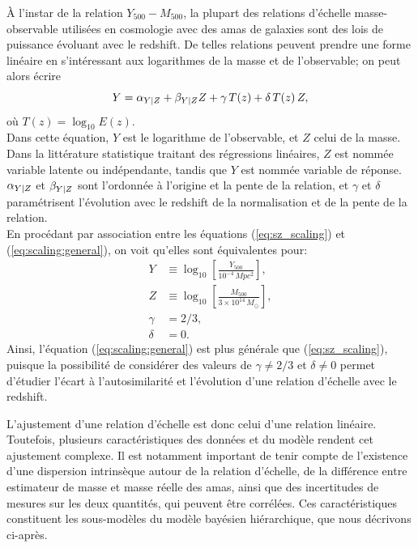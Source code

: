 À l'instar de la relation $Y_{500} - M_{500}$, la plupart des relations d'échelle masse-observable utilisées en cosmologie avec des amas de galaxies sont des lois de puissance évoluant avec le redshift.
De telles relations peuvent prendre une forme linéaire en s'intéressant aux logarithmes de la masse et de l'observable; on peut alors écrire
\begin{equation}
    \label{eq:scaling:general}
    Y = \alpha_{Y|Z} + \beta_{Y|Z} Z + \gamma \, T(z) + \delta \, T(z) \, Z,
\end{equation}
où $T(z) = \log_{10} E(z)$. \\
Dans cette équation, $Y$ est le logarithme de l'observable, et $Z$ celui de la masse\footnotemark.
Dans la littérature statistique traitant des régressions linéaires, $Z$ est nommée variable latente ou indépendante, tandis que $Y$ est nommée variable de réponse.
$\alpha_{Y|Z}$ et $\beta_{Y|Z}$ sont l'ordonnée à l'origine et la pente de la relation, et $\gamma$ et $\delta$ paramétrisent l'évolution avec le redshift de la normalisation et de la pente de la relation. \\
En procédant par association entre les équations (\ref{eq:sz_scaling}) et (\ref{eq:scaling:general}), on voit qu'elles sont équivalentes pour:
\begin{align}
    \nonumber Y &\equiv \log_{10} \left[\frac{Y_{500}}{10^{-4} \,\unit{Mpc^2}}\right], \\
    \nonumber Z &\equiv \log_{10} \left[\frac{M_{500}}{3 \times 10^{14} \,M_\odot}\right], \\
    \nonumber \gamma &= 2/3, \\
    \delta &= 0.
    \label{eq:scaling:sz}
\end{align}
Ainsi, l'équation (\ref{eq:scaling:general}) est plus générale que (\ref{eq:sz_scaling}), puisque la possibilité de considérer des valeurs de $\gamma \neq 2/3$ et $\delta \neq 0$ permet d'étudier l'écart à l'autosimilarité et l'évolution d'une relation d'échelle avec le redshift.

L'ajustement d'une relation d'échelle est donc celui d'une relation linéaire.
Toutefois, plusieurs caractéristiques des données et du modèle rendent cet ajustement complexe.
Il est notamment important de tenir compte de l'existence d'une dispersion intrinsèque autour de la relation d'échelle, de la différence entre estimateur de masse et masse réelle des amas, ainsi que des incertitudes de mesures sur les deux quantités, qui peuvent être corrélées.
Ces caractéristiques constituent les sous-modèles du modèle bayésien hiérarchique, que nous décrivons ci-après.

